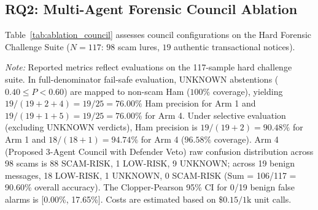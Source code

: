 \subsection{RQ2: Multi-Agent Forensic Council Ablation}
\label{subsec:res_rq2}

Table~\ref{tab:ablation_council} assesses council configurations on the Hard Forensic Challenge Suite ($N=117$: $98$ scam lures, $19$ authentic transactional notices).

\begin{table}[t]
\centering
\caption{Empirical Performance, Per-Class Metrics, and Cost Matrix on Hard Forensic Challenge Suite ($N=117$, 98 Scam, 19 Benign)}
\label{tab:ablation_council}
\renewcommand{\arraystretch}{0.92}
\par\vspace{6pt}
\parbox{\textwidth}{\footnotesize \textit{Note:} Reported metrics reflect evaluations on the 117-sample hard challenge suite. In full-denominator fail-safe evaluation, UNKNOWN abstentions ($0.40 \le P < 0.60$) are mapped to non-scam Ham ($100\%$ coverage), yielding $19/(19 + 2 + 4) = 19/25 = 76.00\%$ Ham precision for Arm 1 and $19/(19 + 1 + 5) = 19/25 = 76.00\%$ for Arm 4. Under selective evaluation (excluding UNKNOWN verdicts), Ham precision is $19/(19+2) = 90.48\%$ for Arm 1 and $18/(18+1) = 94.74\%$ for Arm 4 ($96.58\%$ coverage). Arm 4 (Proposed 3-Agent Council with Defender Veto) raw confusion distribution across 98 scams is 88 SCAM-RISK, 1 LOW-RISK, 9 UNKNOWN; across 19 benign messages, 18 LOW-RISK, 1 UNKNOWN, 0 SCAM-RISK (Sum = 106/117 = 90.60\% overall accuracy). The Clopper-Pearson 95\% CI for 0/19 benign false alarms is [0.00\%, 17.65\%]. Costs are estimated based on $\$0.15/1\text{k}$ unit calls.}
\end{table}

